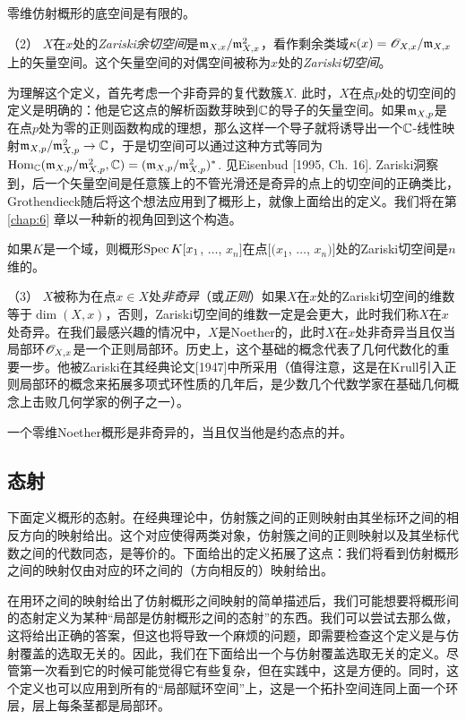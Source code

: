 \begin{exe}
	零维仿射概形的底空间是有限的。
\end{exe}

（2） $X$在$x$处的\textit{Zariski余切空间}是$\mathfrak{m}_{X,x}/\mathfrak{m}_{X,x}^2$，看作剩余类域$\kappa(x)=\mathscr{O}_{X,x}/\mathfrak{m}_{X,x}$上的矢量空间。这个矢量空间的对偶空间被称为$x$处的\textit{Zariski切空间}。

为理解这个定义，首先考虑一个非奇异的复代数簇$X$. 此时，$X$在点$p$处的切空间的定义是明确的：他是它这点的解析函数芽映到$\mathbb{C}$的导子的矢量空间。如果$\mathfrak{m}_{X,p}$是在点$p$处为零的正则函数构成的理想，那么这样一个导子就将诱导出一个$\mathbb{C}$-线性映射$\mathfrak{m}_{X,p}/\mathfrak{m}_{X,p}^2\to \mathbb{C}$，于是切空间可以通过这种方式等同为$\operatorname{Hom}_{\mathbb{C}}(\mathfrak{m}_{X,p}/\mathfrak{m}_{X,p}^2,\mathbb{C})=(\mathfrak{m}_{X,p}/\mathfrak{m}_{X,p}^2)^*$. 见Eisenbud [1995, Ch. 16]. Zariski洞察到，后一个矢量空间是任意簇上的不管光滑还是奇异的点上的切空间的正确类比，Grothendieck随后将这个想法应用到了概形上，就像上面给出的定义。我们将在第 \ref{chap:6} 章以一种新的视角回到这个构造。

\begin{exe}
如果$K$是一个域，则概形$\operatorname{Spec} K[x_1$, $\dots$, $x_n]$在点$[(x_1$, $\dots$, $x_n)]$处的Zariski切空间是$n$维的。
\end{exe}

（3） $X$被称为在点$x\in X$处\textit{非奇异}（或\textit{正则}）如果$X$在$x$处的Zariski切空间的维数等于$\dim(X,x)$，否则，Zariski切空间的维数一定是会更大，此时我们称$X$在$x$处奇异。在我们最感兴趣的情况中，$X$是Noether的，此时$X$在$x$处非奇异当且仅当局部环$\mathscr{O}_{X,x}$是一个正则局部环。历史上，这个基础的概念代表了几何代数化的重要一步。他被Zariski在其经典论文[1947]中所采用（值得注意，这是在Krull引入正则局部环的概念来拓展多项式环性质的几年后，是少数几个代数学家在基础几何概念上击败几何学家的例子之一）。

\begin{exe}
一个零维Noether概形是非奇异的，当且仅当他是约态点的并。
\end{exe}

\subsection{态射}

下面定义概形的态射。在经典理论中，仿射簇之间的正则映射由其坐标环之间的相反方向的映射给出。这个对应使得两类对象，仿射簇之间的正则映射以及其坐标代数之间的代数同态，是等价的。下面给出的定义拓展了这点：我们将看到仿射概形之间的映射仅由对应的环之间的（方向相反的）映射给出。

在用环之间的映射给出了仿射概形之间映射的简单描述后，我们可能想要将概形间的态射定义为某种“局部是仿射概形之间的态射”的东西。我们可以尝试去那么做，这将给出正确的答案，但这也将导致一个麻烦的问题，即需要检查这个定义是与仿射覆盖的选取无关的。因此，我们在下面给出一个与仿射覆盖选取无关的定义。尽管第一次看到它的时候可能觉得它有些复杂，但在实践中，这是方便的。同时，这个定义也可以应用到所有的“局部赋环空间”上，这是一个拓扑空间连同上面一个环层，层上每条茎都是局部环。

